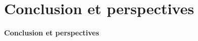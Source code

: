 \chapter*{Conclusion et perspectives}


\cleardoublepage
{\Large\textbf{Conclusion et perspectives}
}\\

